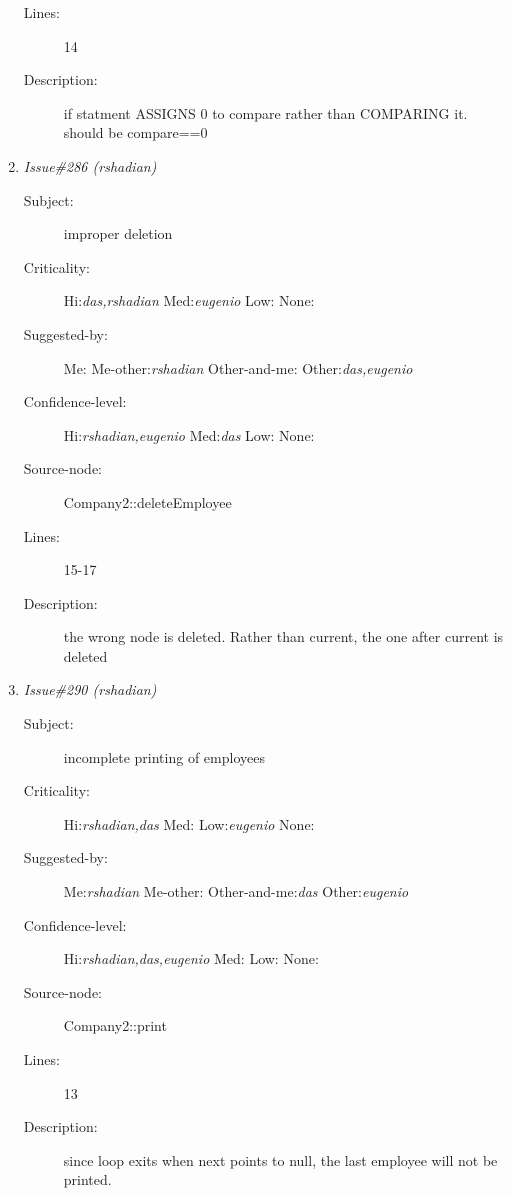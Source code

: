 \begin{enumerate}
\begin{description}
\item [Lines:] 14

\item [Description:] if statment ASSIGNS 0 to compare rather than
COMPARING it.  should be compare==0
\end{description}
\item {\it Issue\#286 (rshadian)}
\begin{description}
\item [Subject:] improper deletion
\item [Criticality:] Hi:{\it das,rshadian} Med:{\it eugenio} Low:{\it } None:{\it }
\item [Suggested-by:] Me:{\it } Me-other:{\it rshadian} Other-and-me:{\it } Other:{\it das,eugenio}
\item [Confidence-level:] Hi:{\it rshadian,eugenio} Med:{\it das} Low:{\it } None:{\it }
\item [Source-node:] Company2::deleteEmployee

\item [Lines:] 15-17

\item [Description:] the wrong node is deleted. Rather than
current, the one after current is deleted
\end{description}
\item {\it Issue\#290 (rshadian)}
\begin{description}
\item [Subject:] incomplete printing of employees
\item [Criticality:] Hi:{\it rshadian,das} Med:{\it } Low:{\it eugenio} None:{\it }
\item [Suggested-by:] Me:{\it rshadian} Me-other:{\it } Other-and-me:{\it das} Other:{\it eugenio}
\item [Confidence-level:] Hi:{\it rshadian,das,eugenio} Med:{\it } Low:{\it } None:{\it }
\item [Source-node:] Company2::print

\item [Lines:] 13

\item [Description:] since loop exits when next points to null, the
last employee will not be printed.
\end{description}
\end{enumerate}
